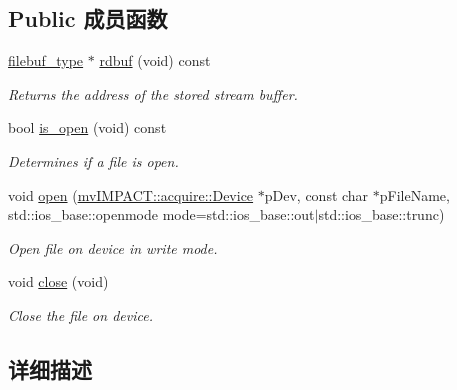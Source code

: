 \subsection*{Public 成员函数}
\begin{DoxyCompactItemize}
\item 
\hyperlink{classmv_i_m_p_a_c_t_1_1acquire_1_1_gen_i_cam_1_1_o_dev_file_stream_buf}{filebuf\+\_\+type} $\ast$ \hyperlink{classmv_i_m_p_a_c_t_1_1acquire_1_1_gen_i_cam_1_1_o_dev_file_stream_base_a7d4c433c77be828124c45899d26ef34e}{rdbuf} (void) const 
\begin{DoxyCompactList}\small\item\em Returns the address of the stored stream buffer. \end{DoxyCompactList}\item 
bool \hyperlink{classmv_i_m_p_a_c_t_1_1acquire_1_1_gen_i_cam_1_1_o_dev_file_stream_base_aef7902b4fd30e5dbd799e0dd45e397dc}{is\+\_\+open} (void) const 
\begin{DoxyCompactList}\small\item\em Determines if a file is open. \end{DoxyCompactList}\item 
void \hyperlink{classmv_i_m_p_a_c_t_1_1acquire_1_1_gen_i_cam_1_1_o_dev_file_stream_base_a7320dc61122a8643618f16afa01e7619}{open} (\hyperlink{classmv_i_m_p_a_c_t_1_1acquire_1_1_device}{mv\+I\+M\+P\+A\+C\+T\+::acquire\+::\+Device} $\ast$p\+Dev, const char $\ast$p\+File\+Name, std\+::ios\+\_\+base\+::openmode mode=std\+::ios\+\_\+base\+::out$\vert$std\+::ios\+\_\+base\+::trunc)
\begin{DoxyCompactList}\small\item\em Open file on device in write mode. \end{DoxyCompactList}\item 
\hypertarget{classmv_i_m_p_a_c_t_1_1acquire_1_1_gen_i_cam_1_1_o_dev_file_stream_base_a18c100cf08c0f6d64230a569de872a40}{void \hyperlink{classmv_i_m_p_a_c_t_1_1acquire_1_1_gen_i_cam_1_1_o_dev_file_stream_base_a18c100cf08c0f6d64230a569de872a40}{close} (void)}\label{classmv_i_m_p_a_c_t_1_1acquire_1_1_gen_i_cam_1_1_o_dev_file_stream_base_a18c100cf08c0f6d64230a569de872a40}

\begin{DoxyCompactList}\small\item\em Close the file on device. \end{DoxyCompactList}\end{DoxyCompactItemize}


\subsection{详细描述}
